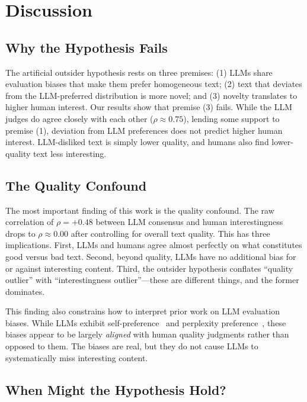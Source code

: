 \section{Discussion}
\label{sec:discussion}

\subsection{Why the Hypothesis Fails}
\label{sec:why_fails}

The artificial outsider hypothesis rests on three premises: (1) LLMs share evaluation biases that make them prefer homogeneous text; (2) text that deviates from the LLM-preferred distribution is more novel; and (3) novelty translates to higher human interest.
Our results show that premise (3) fails.
While the LLM judges do agree closely with each other ($\rho \approx 0.75$), lending some support to premise (1), deviation from LLM preferences does not predict higher human interest.
LLM-disliked text is simply lower quality, and humans also find lower-quality text less interesting.

\subsection{The Quality Confound}
\label{sec:quality_confound}

The most important finding of this work is the quality confound.
The raw correlation of $\rho = +0.48$ between LLM consensus and human interestingness drops to $\rho \approx 0.00$ after controlling for overall text quality.
This has three implications.
First, LLMs and humans agree almost perfectly on what constitutes good versus bad text.
Second, beyond quality, LLMs have no additional bias for or against interesting content.
Third, the outsider hypothesis conflates ``quality outlier'' with ``interestingness outlier''---these are different things, and the former dominates.

This finding also constrains how to interpret prior work on LLM evaluation biases.
While LLMs exhibit self-preference~\citep{panickssery2024llm} and perplexity preference~\citep{wataoka2024self}, these biases appear to be largely \emph{aligned} with human quality judgments rather than opposed to them.
The biases are real, but they do not cause LLMs to systematically miss interesting content.

\subsection{When Might the Hypothesis Hold?}
\label{sec:when_hold}

